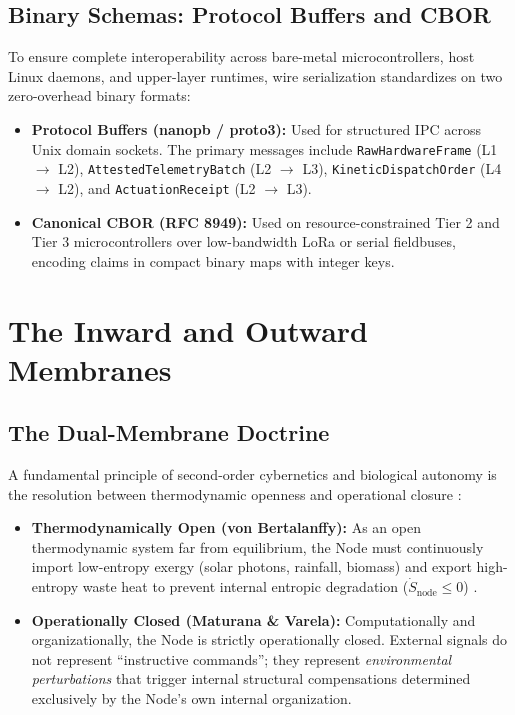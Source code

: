 \subsection{Binary Schemas: Protocol Buffers and CBOR}

To ensure complete interoperability across bare-metal microcontrollers, host Linux daemons, and upper-layer runtimes, wire serialization standardizes on two zero-overhead binary formats:
\begin{itemize}
    \item \textbf{Protocol Buffers (nanopb / proto3):} Used for structured IPC across Unix domain sockets. The primary messages include \texttt{RawHardwareFrame} (L1 $\to$ L2), \texttt{AttestedTelemetryBatch} (L2 $\to$ L3), \texttt{KineticDispatchOrder} (L4 $\to$ L2), and \texttt{ActuationReceipt} (L2 $\to$ L3).
    \item \textbf{Canonical CBOR (RFC 8949):} Used on resource-constrained Tier 2 and Tier 3 microcontrollers over low-bandwidth LoRa or serial fieldbuses, encoding claims in compact binary maps with integer keys.
\end{itemize}

\section{The Inward and Outward Membranes}
\label{sec:l2_dual_membrane}

\subsection{The Dual-Membrane Doctrine}

A fundamental principle of second-order cybernetics and biological autonomy is the resolution between thermodynamic openness and operational closure \parencite{varela1979}:
\begin{itemize}
    \item \textbf{Thermodynamically Open (von Bertalanffy):} As an open thermodynamic system far from equilibrium, the Node must continuously import low-entropy exergy (solar photons, rainfall, biomass) and export high-entropy waste heat to prevent internal entropic degradation ($\dot{S}_{\mathrm{node}} \le 0$) \parencite{jorgensen2001thermodynamics}.
    \item \textbf{Operationally Closed (Maturana \& Varela):} Computationally and organizationally, the Node is strictly operationally closed. External signals do not represent ``instructive commands''; they represent \textit{environmental perturbations} that trigger internal structural compensations determined exclusively by the Node's own internal organization.
\end{itemize}

